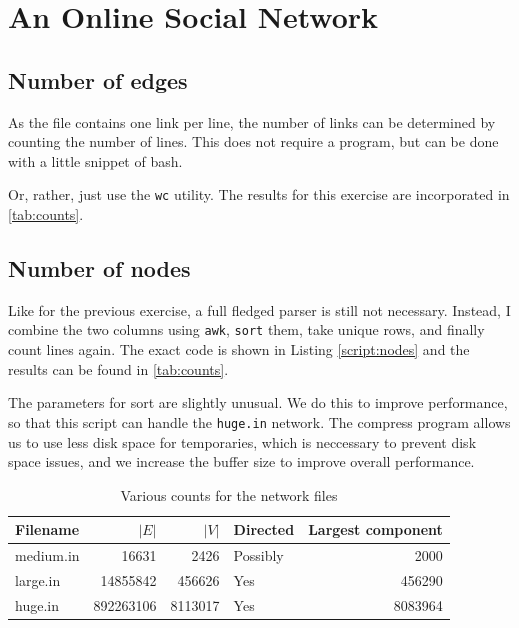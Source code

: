 \documentclass[12pt,a4paper,hidelinks]{article}
\begin{document}
\section{An Online Social Network}

\subsection{Number of edges}

As the file contains one link per line, the number of links can be determined by counting the number of lines. This does not require a program, but can be done with a little snippet of bash.



Or, rather, just use the \texttt{wc} utility. The results for this exercise are incorporated in \autoref{tab:counts}.

\subsection{Number of nodes}

Like for the previous exercise, a full fledged parser is still not necessary. Instead, I combine the two columns using \texttt{awk}, \texttt{sort} them, take unique rows, and finally count lines again. The exact code is shown in Listing \ref{script:nodes} and the results can be found in \autoref{tab:counts}.



The parameters for sort are slightly unusual. We do this to improve performance, so that this script can handle the \texttt{huge.in} network. The compress program allows us to use less disk space for temporaries, which is neccessary to prevent disk space issues, and we increase the buffer size to improve overall performance.

\begin{table}
\centering
\begin{tabular}{l | r | r | l | r}
Filename & {\centering $|E|$} & $|V|$ & Directed & Largest component\\
\hline
medium.in & 16631 & 2426 & Possibly & 2000 \\
large.in & 14855842 & 456626 & Yes & 456290 \\
huge.in & 892263106 & 8113017 & Yes & 8083964
\end{tabular}
\caption{Various counts for the network files}
\label{tab:counts}
\end{table}
\end{document}

